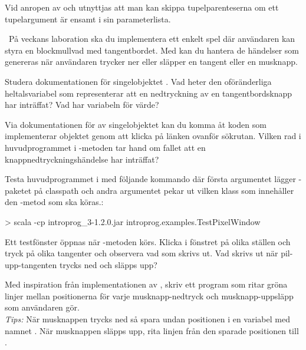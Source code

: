 \SubtaskSolved Vid anropen av  och  utnyttjas att man kan skippa tupelparenteserna om ett tupelargument är ensamt i sin parameterlista.



\QUESTEND




\QUESTBEGIN

\Task \what~På veckans laboration ska du implementera ett enkelt spel där användaren kan styra en blockmullvad med tangentbordet. Med  kan du hantera de händelser som genereras när användaren trycker ner eller släpper en tangent eller en musknapp.


\Subtask Studera dokumentationen för singelobjektet . Vad heter den oföränderliga heltalsvariabel som representerar att en nedtryckning av en tangentbordsknapp har inträffat? Vad har variabeln för värde?

\Subtask Via dokumentationen för av singelobjektet  kan du komma åt koden som implementerar objektet genom att klicka på länken  ovanför sökrutan. Vilken rad i huvudprogrammet i -metoden tar hand om fallet att en knappnedtryckningshändelse har inträffat?

\Subtask Testa huvudprogrammet i  med följande kommando där första argumentet lägger -paketet på classpath och andra argumentet pekar ut vilken klass som innehåller den -metod som ska köras.:
\begin{REPLnonum}
> scala -cp introprog_3-1.2.0.jar introprog.examples.TestPixelWindow
\end{REPLnonum}
Ett testfönster öppnas när -metoden körs. Klicka i fönstret på olika ställen och tryck på olika tangenter och observera vad som skrivs ut. Vad skrivs ut när pil-upp-tangenten trycks ned och släpps upp?

\Subtask Med inspiration från implementationen av , skriv ett program som ritar gröna linjer mellan positionerna för varje musknapp-nedtryck och musknapp-uppsläpp som användaren gör. \\\emph{Tips:} När musknappen trycks ned så spara undan positionen i en variabel med namnet . När musknappen släpps upp, rita linjen från den sparade positionen till .

\SOLUTION

